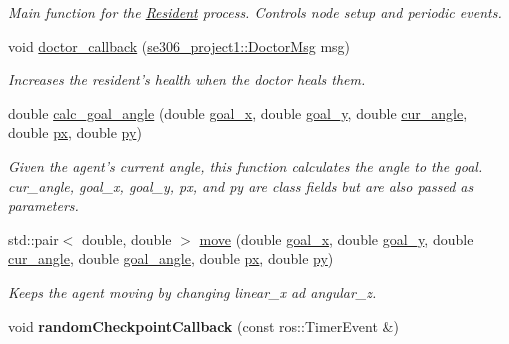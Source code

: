 \begin{DoxyCompactItemize}
\begin{DoxyCompactList}\small\item\em Main function for the \hyperlink{classResident}{Resident} process. Controls node setup and periodic events. \end{DoxyCompactList}\item 
void \hyperlink{classResident_a6d8fbbc8a60508ec913fb41d7e743094}{doctor\-\_\-callback} (\hyperlink{structse306__project1_1_1DoctorMsg__}{se306\-\_\-project1\-::\-Doctor\-Msg} msg)
\begin{DoxyCompactList}\small\item\em Increases the resident's health when the doctor heals them. \end{DoxyCompactList}\item 
double \hyperlink{classResident_ae8e00862499c8a502b5c99f8267d3345}{calc\-\_\-goal\-\_\-angle} (double \hyperlink{classResident_adee57a6649dfa4a41d027fbb8d961226}{goal\-\_\-x}, double \hyperlink{classResident_a30e28a999b67c4db3500c9c3c9989a10}{goal\-\_\-y}, double \hyperlink{classResident_a4781565db7a2e58566d2120623fbc13e}{cur\-\_\-angle}, double \hyperlink{classResident_aa147b3e473b2ea32b732eb5146ec7e34}{px}, double \hyperlink{classResident_ac757cac74a1712dd5746d1c3f5702a21}{py})
\begin{DoxyCompactList}\small\item\em Given the agent's current angle, this function calculates the angle to the goal. cur\-\_\-angle, goal\-\_\-x, goal\-\_\-y, px, and py are class fields but are also passed as parameters. \end{DoxyCompactList}\item 
std\-::pair$<$ double, double $>$ \hyperlink{classResident_a6f48fd57a638a2b4599777a1be766296}{move} (double \hyperlink{classResident_adee57a6649dfa4a41d027fbb8d961226}{goal\-\_\-x}, double \hyperlink{classResident_a30e28a999b67c4db3500c9c3c9989a10}{goal\-\_\-y}, double \hyperlink{classResident_a4781565db7a2e58566d2120623fbc13e}{cur\-\_\-angle}, double \hyperlink{classResident_a194117576f1937cac43ac1b05b884085}{goal\-\_\-angle}, double \hyperlink{classResident_aa147b3e473b2ea32b732eb5146ec7e34}{px}, double \hyperlink{classResident_ac757cac74a1712dd5746d1c3f5702a21}{py})
\begin{DoxyCompactList}\small\item\em Keeps the agent moving by changing linear\-\_\-x ad angular\-\_\-z. \end{DoxyCompactList}\item 
\hypertarget{classResident_a538db1d9cce0d967a78e7d10876d76ca}{void {\bfseries random\-Checkpoint\-Callback} (const ros\-::\-Timer\-Event \&)}\label{classResident_a538db1d9cce0d967a78e7d10876d76ca}


\end{DoxyCompactItemize}
